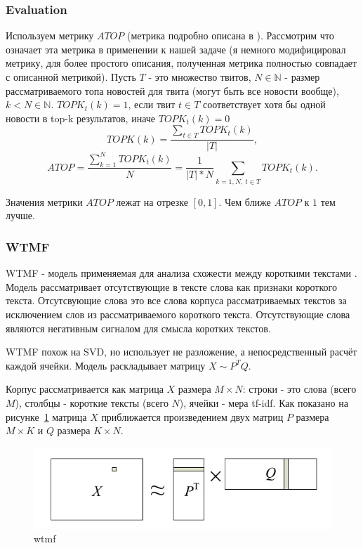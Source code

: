 \documentclass[14pt,a4paper,oneside]{extarticle}
\begin{document}
        \subsubsection{Evaluation}
            Используем метрику $ATOP$ (метрика подробно описана в \cite{steck_recommender}).
            Рассмотрим что означает эта метрика в применении к нашей задаче (я немного модифицировал метрику, для более простого описания, полученная метрика полностью совпадает с описанной метрикой).
            Пусть $T$ - это множество твитов, $N \in \mathbb{N}$ - размер рассматриваемого топа новостей для твита (могут быть все новости вообще), $k < N \in \mathbb{N}$.
            $TOPK_t(k) = 1$, если твит $t \in T$ соответствует хотя бы одной новости в top-k результатов, иначе $TOPK_t(k) = 0$
            $$TOPK(k) = \dfrac {\sum_{t \in T} TOPK_t(k)} {|T|},$$
            $$ATOP = \dfrac{\sum_{k=1}^N TOPK_t(k)}{N} = \dfrac{1}{|T| * N} \sum_{k=\overline{1,N}, ~t \in T} TOPK_t(k).$$

            Значения метрики $ATOP$ лежат на отрезке $[0,1]$. Чем ближе $ATOP$ к $1$ тем лучше.

        \subsubsection{WTMF}
            WTMF - модель применяемая для анализа схожести между короткими текстами \cite{wtmf}. Модель рассматривает отсутствующие в тексте слова как признаки короткого текста. Отсутсвующие слова это все слова корпуса рассматриваемых текстов за исключением слов из рассматриваемого короткого текста. Отсутствующие слова являются негативным сигналом для смысла коротких текстов.

            WTMF похож на SVD, но использует не разложение, а непосредственный расчёт каждой ячейки. Модель раскладывает матрицу $X \sim P^TQ$.

            Корпус рассматривается как матрица $X$ размера $M \times N$: строки - это слова (всего $M$), столбцы - короткие тексты (всего $N$), ячейки - мера tf-idf. 
            Как показано на рисунке~\ref{pic:wtmf} матрица $X$ приближается произведением двух матриц $P$ размера $M \times K$ и $Q$ размера $K \times N$.

            \begin{figure}[h!]
                \center
                \includegraphics[scale=0.45]{wtmf.png}
                \caption{wtmf}
                \label{pic:wtmf}
            \end{figure}
\end{document}
